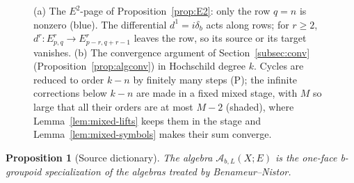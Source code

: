 \documentclass[11pt,oneside,reqno]{article}
\newcommand{\cA}{\mathcal A}
\theoremstyle{plain}
\newtheorem{proposition}[theorem]{Proposition}
\theoremstyle{definition}
\theoremstyle{remark}
\begin{document}
\begin{figure}[tbp]
\caption[The order spectral sequence and its convergence]{(a) The
\(E^2\)-page of Proposition~\ref{prop:E2}: only the row \(q=n\) is nonzero
(blue). The differential \(d^1=i\delta_b\) acts along rows; for \(r\geq2\),
\(d^r:E^r_{p,q}\to E^r_{p-r,q+r-1}\) leaves the row, so its source or its
target vanishes. (b) The convergence argument of Section~\ref{subsec:conv}
(Proposition~\ref{prop:algconv}) in Hochschild degree \(k\). Cycles are
reduced to order \(k-n\) by finitely many steps (P); the infinite
corrections below \(k-n\) are made in a fixed mixed stage, with \(M\) so
large that all their orders are at most \(M-2\) (shaded), where
Lemma~\ref{lem:mixed-lifts} keeps them in the stage and
Lemma~\ref{lem:mixed-symbols} makes their sum converge.}
\label{fig:E2row}
\end{figure}

\begin{proposition}[Source dictionary]\label{prop:hypotheses}
The algebra \(\cA_{b,L}(X;E)\) is the one-face b-groupoid specialization of
the algebras treated by Benameur--Nistor.
\end{proposition}
\end{document}
